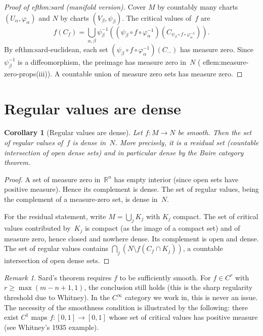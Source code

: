 \documentclass[12pt,a4paper,openany]{book}
\newtheorem{corollary}[theorem]{Corollary}
\theoremstyle{definition}
\theoremstyle{remark}
\newtheorem{remark}[theorem]{Remark}
\newcommand{\R}{\mathbb{R}}
\begin{document}
\begin{proof}[Proof of 
ef{thm:sard} (manifold version)]
Cover $M$ by countably many charts $(U_\alpha,\varphi_\alpha)$ and $N$ by
charts $(V_\beta,\psi_\beta)$.  The critical values of~$f$ are
\[
  f(C_f) = \bigcup_{\alpha,\beta} \psi_\beta^{-1}\!\left(
  (\psi_\beta\circ f\circ\varphi_\alpha^{-1})
  (C_{\psi_\beta\circ f\circ\varphi_\alpha^{-1}})\right).
\]
By 
ef{thm:sard-euclidean}, each set
$(\psi_\beta\circ f\circ\varphi_\alpha^{-1})(C_{\cdots})$ has measure zero.
Since $\psi_\beta^{-1}$ is a diffeomorphism, the preimage has measure zero
in~$N$ (
ef{lem:measure-zero-props}(iii)).  A countable union of measure
zero sets has measure zero.
\end{proof}

\section{Regular values are dense}\label{sec:regular-dense}

\begin{corollary}[Regular values are dense]\label{cor:regular-dense}
Let $f\colon M\to N$ be smooth.  Then the set of regular values
of~$f$ is dense in~$N$.  More precisely, it is a residual set
(countable intersection of open dense sets) and in particular dense
by the Baire category theorem.
\end{corollary}

\begin{proof}
A set of measure zero in~$\R^n$ has empty interior (since open sets
have positive measure).  Hence its complement is dense.  The set of
regular values, being the complement of a measure-zero set, is dense
in~$N$.

For the residual statement, write $M = \bigcup_j K_j$ with $K_j$
compact.  The set of critical values contributed by~$K_j$ is compact
(as the image of a compact set) and of measure zero, hence closed and
nowhere dense.  Its complement is open and dense.  The set of regular
values contains $\bigcap_j(N\setminus f(C_f\cap K_j))$, a countable
intersection of open dense sets.
\end{proof}

\begin{remark}\label{rem:sard-smoothness}
Sard's theorem requires $f$ to be sufficiently smooth.  For $f\in C^r$
with $r \ge \max(m-n+1, 1)$, the conclusion still holds (this is the
sharp regularity threshold due to Whitney).  In the $C^\infty$ category
we work in, this is never an issue.  The necessity of the smoothness
condition is illustrated by the following: there exist $C^1$ maps
$f\colon[0,1]\to[0,1]$ whose set of critical values has positive
measure (see Whitney's 1935 example).
\end{remark}
\end{document}
